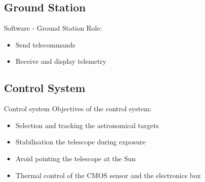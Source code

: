 \documentclass[11pt, aspectratio=169]{beamer}
\begin{document}
\subsection{Ground Station}

    \begin{frame}[c]{Software - Ground Station}
        Role:
        \begin{itemize}
            \item Send telecommands
            \item Receive and display telemetry
        \end{itemize}
    \end{frame}

\subsection{Control System}

\begin{frame}{Control system}
    Objectives of the control system:
    \begin{itemize}
        \item Selection and tracking the astronomical targets
        \item Stabilisation the telescope during exposure
        \item Avoid pointing the telescope at the Sun
        \item Thermal control of the CMOS sensor and the electronics box
    \end{itemize}
\end{frame}
\end{document}
